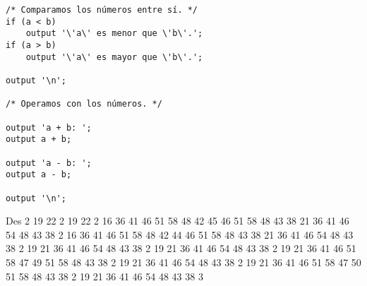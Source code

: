 \begin{enumerate}
\begin{tcolorbox}[title={Código fuente}, colback=white]
\begin{lstlisting}
/* Comparamos los números entre sí. */
if (a < b)
    output '\'a\' es menor que \'b\'.';
if (a > b)
    output '\'a\' es mayor que \'b\'.';

output '\n';

/* Operamos con los números. */

output 'a + b: ';
output a + b;

output 'a - b: ';
output a - b;

output '\n';
        \end{lstlisting}        
    \end{tcolorbox}

    \begin{tcolorbox}[title={Volcado del fichero de parse}, colback=white, breakable]
Des 2 19 22 2 19 22 2 16 36 41 46 51 58 48 42 45 46 51 58 48 43 38 21 36 41 46 54 48 43 38 2 16 36 41 46 51 58 48 42 44 46 51 58 48 43 38 21 36 41 46 54 48 43 38 2 19 21 36 41 46 54 48 43 38 2 19 21 36 41 46 54 48 43 38 2 19 21 36 41 46 51 58 47 49 51 58 48 43 38 2 19 21 36 41 46 54 48 43 38 2 19 21 36 41 46 51 58 47 50 51 58 48 43 38 2 19 21 36 41 46 54 48 43 38 3
    \end{tcolorbox}


\end{enumerate}
